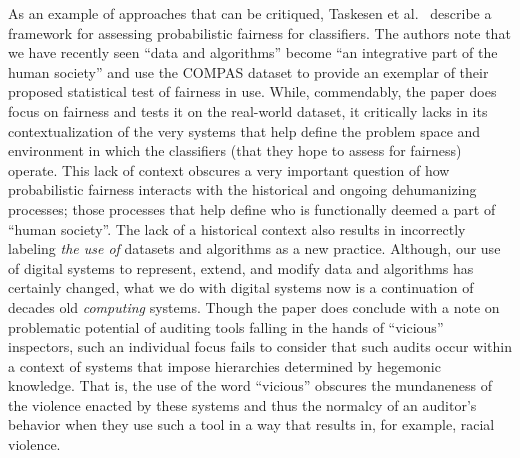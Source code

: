 \documentclass[manuscript]{acmart}
\begin{document}
As an example of approaches that can be critiqued, Taskesen et al.~\cite{taskesen21compas} describe a framework for assessing probabilistic fairness for classifiers. The authors note that we have recently seen ``data and algorithms'' become ``an integrative part of the human society'' and use the COMPAS dataset to provide an exemplar of their proposed statistical test of fairness in use. While, commendably, the paper does focus on fairness and tests it on the real-world dataset, it critically lacks in its contextualization of the very systems that help define the problem space and environment in which the classifiers (that they hope to assess for fairness) operate. This lack of context obscures a very important question of how probabilistic fairness interacts with the historical and ongoing dehumanizing processes; those processes that help define who is functionally deemed a part of ``human society''. The lack of a historical context also results in incorrectly labeling \textit{the use of} datasets and algorithms as a new practice. Although, our use of digital systems to represent, extend, and modify data and algorithms has certainly changed, what we do with digital systems now is a continuation of decades old \textit{computing} systems. Though the paper does conclude with a note on problematic potential of auditing tools falling in the hands of ``vicious'' inspectors, such an individual focus fails to consider that such audits occur within a context of systems that impose hierarchies determined by hegemonic knowledge. That is, the use of the word ``vicious'' obscures the mundaneness of the violence enacted by these systems and thus the normalcy of an auditor’s behavior when they use such a tool in a way that results in, for example, racial violence.
\end{document}
